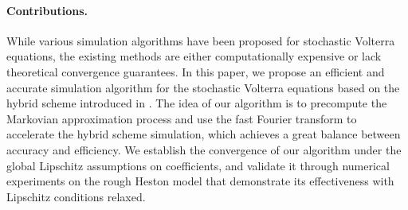 \documentclass[11pt]{article}%
\theoremstyle{definition}
\begin{document}

\paragraph{Contributions.} While various simulation algorithms have been proposed for stochastic Volterra equations, the existing methods are either computationally expensive or lack theoretical convergence guarantees. In this paper, we propose an efficient and accurate simulation algorithm for the stochastic Volterra equations based on the hybrid scheme introduced in \cite{bennedsen_2017_FS}. The idea of our algorithm is to precompute the Markovian approximation process and use the fast Fourier transform to accelerate the hybrid scheme simulation, which achieves a great balance between accuracy and efficiency. We establish the convergence of our algorithm under the global Lipschitz assumptions on coefficients, and validate it through numerical experiments on the rough Heston model that demonstrate its effectiveness with Lipschitz conditions relaxed. 
\end{document}

